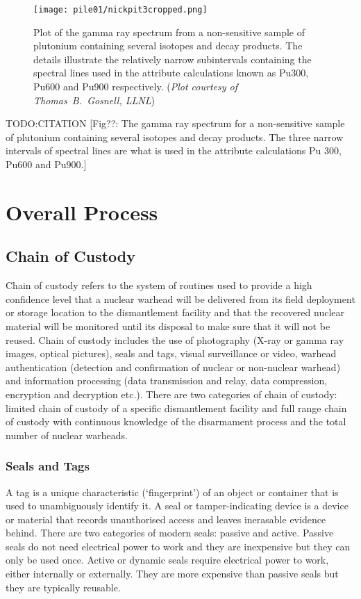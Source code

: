 \documentclass[twoside,titlepage,11pt,twocolumn,a4paper]{article}
\begin{document}
\begin{figure}
  \texttt{[image: pile01/nickpit3cropped.png]}
  \caption{Plot of the gamma ray spectrum from a non-sensitive sample
    of plutonium containing several isotopes and decay products. The
    details illustrate the relatively narrow subintervals containing
    the spectral lines used in the attribute calculations known as
    Pu300, Pu600 and Pu900 respectively. (\emph{Plot courtesy of
      Thomas~B.~Gosnell, LLNL})}
\end{figure}

TODO:CITATION
\citep{wolford2000} [Fig??: The gamma ray
  spectrum for a non-sensitive sample of plutonium containing several
  isotopes and decay products. The three narrow intervals of spectral
  lines are what is used in the attribute calculations Pu 300, Pu600
  and Pu900.]

\section{Overall Process}
\subsection{Chain of Custody}
Chain of custody refers to the system of routines used to provide a
high confidence level that a nuclear warhead will be delivered from
its field deployment or storage location to the dismantlement facility
and that the recovered nuclear material will be monitored until its
disposal to make sure that it will not be reused.
\citep{zarimpas2003} Chain of custody includes the use of photography
(X-ray or gamma ray images, optical pictures), seals and tags, visual
surveillance or video, warhead authentication (detection and
confirmation of nuclear or non-nuclear warhead) and information
processing (data transmission and relay, data compression, encryption
and decryption etc.). There are two categories of chain of custody:
limited chain of custody of a specific dismantlement facility and full
range chain of custody with continuous knowledge of the disarmament
process and the total number of nuclear warheads. \citep{wuwen2004}

\subsubsection{Seals and Tags}
A tag is a unique characteristic (`fingerprint') of an object or
container that is used to unambiguously identify it. A seal or
tamper-indicating device is a device or material that records
unauthorised access and leaves inerasable evidence behind. There are
two categories of modern seals: passive and active. Passive seals do
not need electrical power to work and they are inexpensive but they
can only be used once. Active or dynamic seals require electrical
power to work, either internally or externally. They are more
expensive than passive seals but they are typically reusable.
\citep{nuclearTamperSeals2001}
\end{document}
